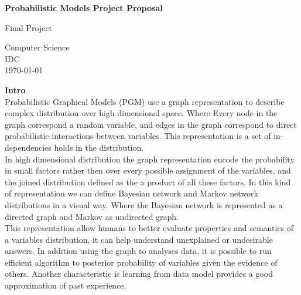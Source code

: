 \documentclass{article}
\begin{document}
    \begin{titlepage}
        \begin{center}
            \vspace*{1cm}
            
            \textbf{Probabilistic Models Project Proposal}
            
            \vspace{0.5cm}
            
            
            \vspace{1.5cm}
            
            \vfill
            
            Final Project\\
            
            \vspace{0.8cm}
            
            
            
            Computer Science\\
            IDC\\
            \today
            
        \end{center}
    \end{titlepage}
    \textbf{Intro}\\
    Probabilistic Graphical Models (PGM) use a graph representation to describe complex distribution over high dimensional space. Where Every node in the graph correspond a random variable, and edges in the graph correspond to direct probabilistic interactions between variables. This representation is a set of in-dependencies holds in the distribution.\\
    In high dimensional distribution the graph representation encode the probability in small factors rather then over every possible assignment of the variables, and the joined distribution defined as the a product of all these factors. In this kind of representation we can define Bayesian network and Markov network distributions in a visual way. Where the Bayesian network is represented as a directed graph and Markov as undirected graph.\\
    This representation allow humans to better evaluate properties and semantics of a variables distribution, it can help understand unexplained or undesirable answers. In addition using the graph to analyses data, it is possible to run efficient algorithm to posterior probability of variables given the evidence of others. Another characteristic is learning from data model provides a good approximation of past experience.\\~\\
\end{document}
